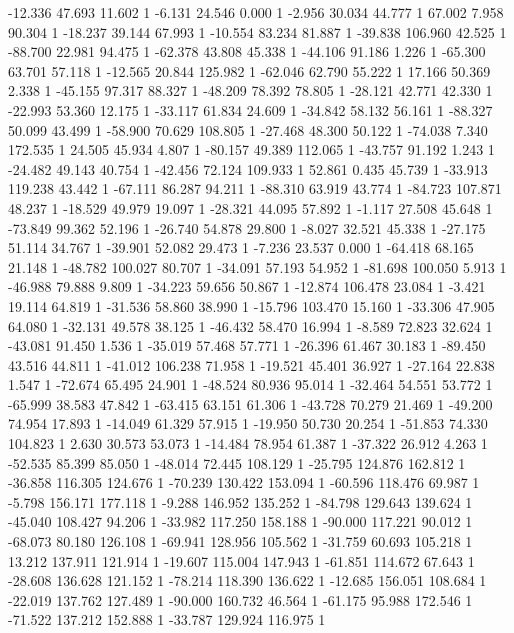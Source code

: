 	-12.336 47.693 11.602 1
	-6.131 24.546 0.000 1
	-2.956 30.034 44.777 1
	67.002 7.958 90.304 1
	-18.237 39.144 67.993 1
	-10.554 83.234 81.887 1
	-39.838 106.960 42.525 1
	-88.700 22.981 94.475 1
	-62.378 43.808 45.338 1
	-44.106 91.186 1.226 1
	-65.300 63.701 57.118 1
	-12.565 20.844 125.982 1
	-62.046 62.790 55.222 1
	17.166 50.369 2.338 1
	-45.155 97.317 88.327 1
	-48.209 78.392 78.805 1
	-28.121 42.771 42.330 1
	-22.993 53.360 12.175 1
	-33.117 61.834 24.609 1
	-34.842 58.132 56.161 1
	-88.327 50.099 43.499 1
	-58.900 70.629 108.805 1
	-27.468 48.300 50.122 1
	-74.038 7.340 172.535 1
	24.505 45.934 4.807 1
	-80.157 49.389 112.065 1
	-43.757 91.192 1.243 1
	-24.482 49.143 40.754 1
	-42.456 72.124 109.933 1
	52.861 0.435 45.739 1
	-33.913 119.238 43.442 1
	-67.111 86.287 94.211 1
	-88.310 63.919 43.774 1
	-84.723 107.871 48.237 1
	-18.529 49.979 19.097 1
	-28.321 44.095 57.892 1
	-1.117 27.508 45.648 1
	-73.849 99.362 52.196 1
	-26.740 54.878 29.800 1
	-8.027 32.521 45.338 1
	-27.175 51.114 34.767 1
	-39.901 52.082 29.473 1
	-7.236 23.537 0.000 1
	-64.418 68.165 21.148 1
	-48.782 100.027 80.707 1
	-34.091 57.193 54.952 1
	-81.698 100.050 5.913 1
	-46.988 79.888 9.809 1
	-34.223 59.656 50.867 1
	-12.874 106.478 23.084 1
	-3.421 19.114 64.819 1
	-31.536 58.860 38.990 1
	-15.796 103.470 15.160 1
	-33.306 47.905 64.080 1
	-32.131 49.578 38.125 1
	-46.432 58.470 16.994 1
	-8.589 72.823 32.624 1
	-43.081 91.450 1.536 1
	-35.019 57.468 57.771 1
	-26.396 61.467 30.183 1
	-89.450 43.516 44.811 1
	-41.012 106.238 71.958 1
	-19.521 45.401 36.927 1
	-27.164 22.838 1.547 1
	-72.674 65.495 24.901 1
	-48.524 80.936 95.014 1
	-32.464 54.551 53.772 1
	-65.999 38.583 47.842 1
	-63.415 63.151 61.306 1
	-43.728 70.279 21.469 1
	-49.200 74.954 17.893 1
	-14.049 61.329 57.915 1
	-19.950 50.730 20.254 1
	-51.853 74.330 104.823 1
	2.630 30.573 53.073 1
	-14.484 78.954 61.387 1
	-37.322 26.912 4.263 1
	-52.535 85.399 85.050 1
	-48.014 72.445 108.129 1
	-25.795 124.876 162.812 1
	-36.858 116.305 124.676 1
	-70.239 130.422 153.094 1
	-60.596 118.476 69.987 1
	-5.798 156.171 177.118 1
	-9.288 146.952 135.252 1
	-84.798 129.643 139.624 1
	-45.040 108.427 94.206 1
	-33.982 117.250 158.188 1
	-90.000 117.221 90.012 1
	-68.073 80.180 126.108 1
	-69.941 128.956 105.562 1
	-31.759 60.693 105.218 1
	13.212 137.911 121.914 1
	-19.607 115.004 147.943 1
	-61.851 114.672 67.643 1
	-28.608 136.628 121.152 1
	-78.214 118.390 136.622 1
	-12.685 156.051 108.684 1
	-22.019 137.762 127.489 1
	-90.000 160.732 46.564 1
	-61.175 95.988 172.546 1
	-71.522 137.212 152.888 1
	-33.787 129.924 116.975 1
